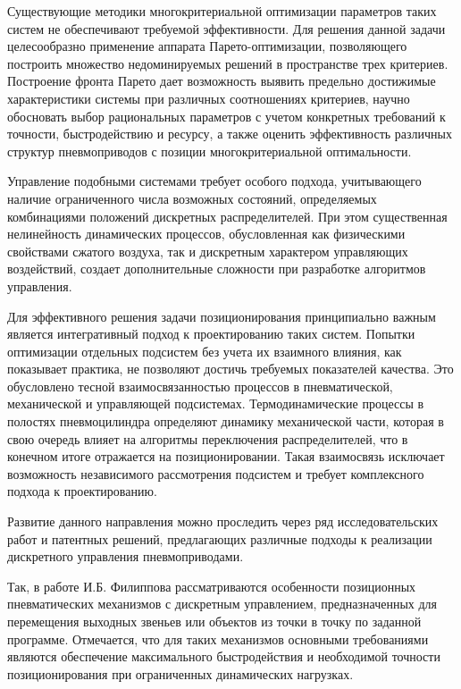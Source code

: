 Существующие методики многокритериальной оптимизации параметров таких систем не обеспечивают требуемой эффективности.
Для решения данной задачи целесообразно применение аппарата Парето-оптимизации, позволяющего построить множество недоминируемых решений в
пространстве трех критериев. Построение фронта Парето дает возможность выявить предельно достижимые характеристики системы при различных соотношениях
критериев, научно обосновать выбор рациональных параметров с учетом конкретных требований к точности, быстродействию и ресурсу, а также оценить
эффективность различных структур пневмоприводов с позиции многокритериальной оптимальности.

Управление подобными системами требует особого подхода, учитывающего наличие ограниченного числа возможных состояний, определяемых комбинациями положений
дискретных распределителей. При этом существенная нелинейность динамических процессов, обусловленная как физическими свойствами сжатого воздуха,
так и дискретным характером управляющих воздействий, создает дополнительные сложности при разработке алгоритмов управления.

Для эффективного решения задачи позиционирования принципиально важным является интегративный подход к проектированию таких систем. Попытки оптимизации отдельных подсистем
без учета их взаимного влияния, как показывает практика, не позволяют достичь требуемых показателей качества. Это обусловлено тесной взаимосвязанностью процессов в
пневматической, механической и управляющей подсистемах. Термодинамические процессы в полостях пневмоцилиндра определяют динамику механической части, которая в свою
очередь влияет на алгоритмы переключения распределителей, что в конечном итоге отражается на позиционировании. Такая взаимосвязь исключает возможность независимого
рассмотрения подсистем и требует комплексного подхода к проектированию.

Развитие данного направления можно проследить через ряд исследовательских работ и патентных решений, предлагающих различные подходы к реализации дискретного управления пневмоприводами.

Так, в работе И.Б. Филиппова \cite*{филиппов:позиц_след_пневмопривод} рассматриваются особенности позиционных пневматических механизмов
с дискретным управлением, предназначенных для перемещения выходных звеньев или объектов из точки в точку по
заданной программе. Отмечается, что для таких механизмов основными требованиями являются обеспечение максимального
быстродействия и необходимой точности позиционирования при ограниченных динамических нагрузках.

